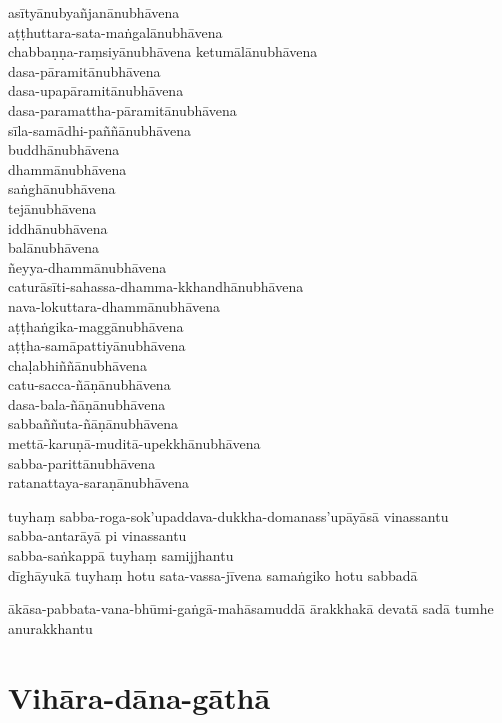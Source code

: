 asītyānubyañjanānubhāvena\\
aṭṭhuttara-sata-maṅgalānubhāvena\\
chabbaṇṇa-raṃsiyānubhāvena ketumālānubhāvena\\
dasa-pāramitānubhāvena\\
dasa-upapāramitānubhāvena\\
dasa-paramattha-pāramitānubhāvena\\
sīla-samādhi-paññānubhāvena\\
buddhānubhāvena\\
dhammānubhāvena\\
saṅghānubhāvena\\
tejānubhāvena\\
iddhānubhāvena\\
balānubhāvena\\
ñeyya-dhammānubhāvena\\
caturāsīti-sahassa-dhamma-kkhandhānubhāvena\\
nava-lokuttara-dhammānubhāvena\\
aṭṭhaṅgika-maggānubhāvena\\
aṭṭha-samāpattiyānubhāvena\\
chaḷabhiññānubhāvena\\
catu-sacca-ñāṇānubhāvena\\
dasa-bala-ñāṇānubhāvena\\
sabbaññuta-ñāṇānubhāvena\\
mettā-karuṇā-muditā-upekkhānubhāvena\\
sabba-parittānubhāvena\\
ratanattaya-saraṇānubhāvena

tuyhaṃ sabba-roga-sok'upaddava-dukkha-domanass'upāyāsā vinassantu\\
sabba-antarāyā pi vinassantu\\
sabba-saṅkappā tuyhaṃ samijjhantu\\
dīghāyukā tuyhaṃ hotu sata-vassa-jīvena samaṅgiko hotu sabbadā

ākāsa-pabbata-vana-bhūmi-gaṅgā-mahāsamuddā ārakkhakā
devatā sadā tumhe anurakkhantu


\section{Vihāra-dāna-gāthā}

